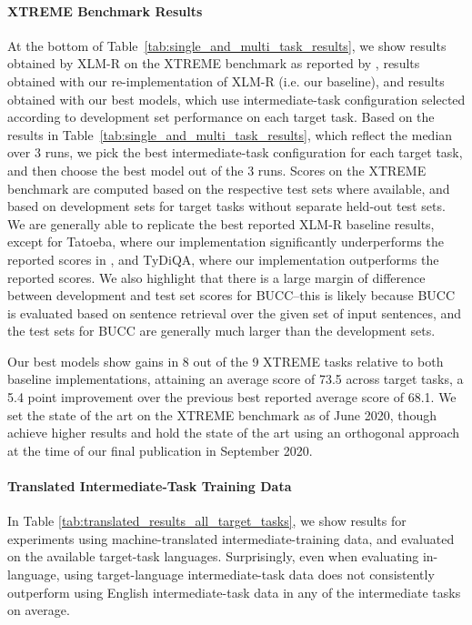 \documentclass[11pt,a4paper]{article}
\begin{document}
\paragraph{XTREME Benchmark Results}

At the bottom of Table~\ref{tab:single_and_multi_task_results}, we show results obtained by \mbox{XLM-R} on the XTREME benchmark as reported by \citet{hu2020xtreme}, results obtained with our re-implementation of XLM-R (i.e. our baseline), and results obtained with our best models, which use intermediate-task configuration selected according to development set performance on each target task. Based on the results in Table~\ref{tab:single_and_multi_task_results}, which reflect the median over 3 runs, we pick the best intermediate-task configuration for each target task, and then choose the best model out of the 3 runs. Scores on the XTREME benchmark are computed based on the respective test sets where available, and based on development sets for target tasks without separate held-out test sets. We are generally able to replicate the best reported \mbox{XLM-R} baseline results, except for Tatoeba, where our implementation significantly underperforms the reported scores in \citet{hu2020xtreme}, and TyDiQA, where our implementation outperforms the reported scores. 
We also highlight that there is a large margin of difference between development and test set scores for BUCC--this is likely because BUCC is evaluated based on sentence retrieval over the given set of input sentences, and the test sets for BUCC are generally much larger than the development sets.

Our best models show gains in 8 out of the 9 XTREME tasks relative to both baseline implementations, attaining an average score of 73.5 across target tasks, a 5.4 point improvement over the previous best reported average score of 68.1. We set the state of the art on the XTREME benchmark as of June 2020, though \citet{fang2020filter} achieve higher results and hold the state of the art using an orthogonal approach at the time of our final publication in September 2020.



\paragraph{Translated Intermediate-Task Training Data}

In Table \ref{tab:translated_results_all_target_tasks}, we show results for experiments using machine-translated intermediate-training data, and evaluated on the available target-task languages. Surprisingly, even when evaluating in-language, using target-language intermediate-task data does not consistently outperform using English intermediate-task data in any of the intermediate tasks on average.
\end{document}
